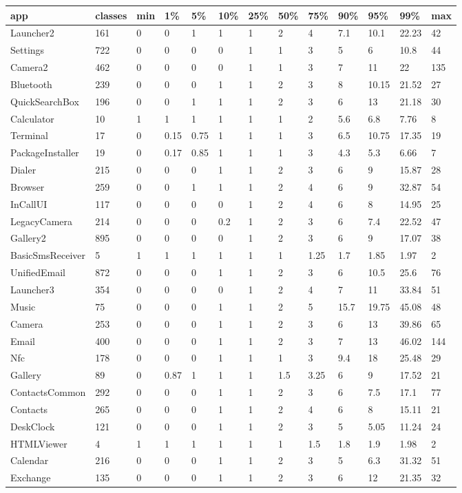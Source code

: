 \begin{tabular}{|l|l|l|l|l|l|l|l|l|l|l|l|l|}
\hline
app&classes&min&1\%&5\%&10\%&25\%&50\%&75\%&90\%&95\%&99\%&max\\
\hline
Launcher2&161&0&0&1&1&1&2&4&7.1&10.1&22.23&42\\
\hline
Settings&722&0&0&0&0&1&1&3&5&6&10.8&44\\
\hline
Camera2&462&0&0&0&0&1&1&3&7&11&22&135\\
\hline
Bluetooth&239&0&0&0&1&1&2&3&8&10.15&21.52&27\\
\hline
QuickSearchBox&196&0&0&1&1&1&2&3&6&13&21.18&30\\
\hline
Calculator&10&1&1&1&1&1&1&2&5.6&6.8&7.76&8\\
\hline
Terminal&17&0&0.15&0.75&1&1&1&3&6.5&10.75&17.35&19\\
\hline
PackageInstaller&19&0&0.17&0.85&1&1&1&3&4.3&5.3&6.66&7\\
\hline
Dialer&215&0&0&0&1&1&2&3&6&9&15.87&28\\
\hline
Browser&259&0&0&1&1&1&2&4&6&9&32.87&54\\
\hline
InCallUI&117&0&0&0&0&1&2&4&6&8&14.95&25\\
\hline
LegacyCamera&214&0&0&0&0.2&1&2&3&6&7.4&22.52&47\\
\hline
Gallery2&895&0&0&0&0&1&2&3&6&9&17.07&38\\
\hline
BasicSmsReceiver&5&1&1&1&1&1&1&1.25&1.7&1.85&1.97&2\\
\hline
UnifiedEmail&872&0&0&0&1&1&2&3&6&10.5&25.6&76\\
\hline
Launcher3&354&0&0&0&0&1&2&4&7&11&33.84&51\\
\hline
Music&75&0&0&0&1&1&2&5&15.7&19.75&45.08&48\\
\hline
Camera&253&0&0&0&1&1&2&3&6&13&39.86&65\\
\hline
Email&400&0&0&0&1&1&2&3&7&13&46.02&144\\
\hline
Nfc&178&0&0&0&1&1&1&3&9.4&18&25.48&29\\
\hline
Gallery&89&0&0.87&1&1&1&1.5&3.25&6&9&17.52&21\\
\hline
ContactsCommon&292&0&0&0&1&1&2&3&6&7.5&17.1&77\\
\hline
Contacts&265&0&0&0&1&1&2&4&6&8&15.11&21\\
\hline
DeskClock&121&0&0&0&1&1&2&3&5&5.05&11.24&24\\
\hline
HTMLViewer&4&1&1&1&1&1&1&1.5&1.8&1.9&1.98&2\\
\hline
Calendar&216&0&0&0&1&1&2&3&5&6.3&31.32&51\\
\hline
Exchange&135&0&0&0&1&1&2&3&6&12&21.35&32\\
\hline
\end{tabular}
